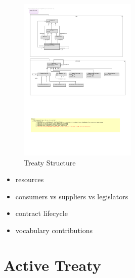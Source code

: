 \documentclass{llncs}
\begin{document}
 
 

\begin{figure}[t]
\centering
\includegraphics[width=0.5\textwidth]{RoleModel1.pdf}
\caption{Treaty Structure}
\label{fig1}
\end{figure}



\begin{itemize}
\item resources
\item consumers vs suppliers vs legislators
\item contract lifecycle
\item vocabulary contributions
\end{itemize}



\section{Active Treaty}
\end{document}
